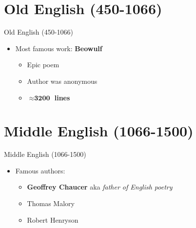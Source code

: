 \documentclass[
  12pt,
  ignorenonframetext,
  progressbar=frametitle]{beamer}
\providecommand{\tightlist}{%
  \setlength{\itemsep}{0pt}\setlength{\parskip}{0pt}}
\begin{document}
\section{Old English (450-1066)}
\begin{frame}[allowframebreaks]
{Old English (450-1066)}
\protect\hypertarget{old-english-450-1066}{}
\begin{itemize}
\tightlist
\item
  Most famous work: \textbf{Beowulf}

  \begin{itemize}
  \tightlist
  \item
    Epic poem
  \item
    Author was anonymous
  \item
    \textbf{\(\boldsymbol\approx \textbf{3200}\) lines}
  \end{itemize}
\end{itemize}
\end{frame}

\section{Middle English (1066-1500)}
\begin{frame}[allowframebreaks]
{Middle English (1066-1500)}
\protect\hypertarget{middle-english-1066-1500}{}
\begin{itemize}
\tightlist
\item
  Famous authors:

  \begin{itemize}
  \tightlist
  \item
    \textbf{Geoffrey Chaucer} aka \emph{father of English poetry}
  \item
    Thomas Malory
  \item
    Robert Henryson
  \end{itemize}
\end{itemize}
\end{frame}
\end{document}
